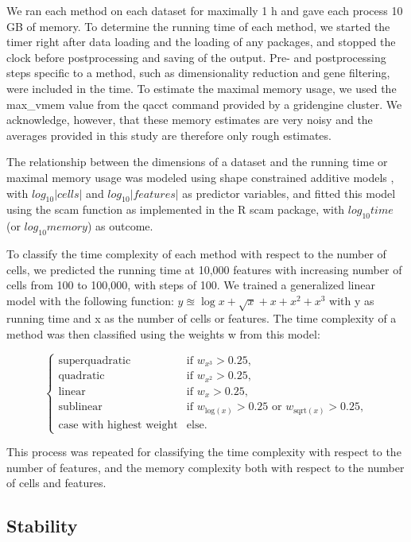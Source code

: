 We ran each method on each dataset for maximally 1 h and gave each process 10 GB of memory. To determine the running time of each method, we started the timer right after data loading and the loading of any packages, and stopped the clock before postprocessing and saving of the output. Pre- and postprocessing steps specific to a method, such as dimensionality reduction and gene filtering, were included in the time. To estimate the maximal memory usage, we used the max\_vmem value from the qacct command provided by a gridengine cluster. We acknowledge, however, that these memory estimates are very noisy and the averages provided in this study are therefore only rough estimates.

The relationship between the dimensions of a dataset and the running time or maximal memory usage was modeled using shape constrained additive models \cite{pya_shapeconstrainedadditive_2015}, with $log_{10}|\textit{cells}|$ and $log_{10}|\textit{features}|$ as predictor variables, and fitted this model using the scam function as implemented in the R scam package, with $log_{10}\textit{time}$ (or $log_{10}\textit{memory}$) as outcome.

To classify the time complexity of each method with respect to the number of cells, we predicted the running time at 10,000 features with increasing number of cells from 100 to 100,000, with steps of 100. We trained a generalized linear model with the following function: $y \approxeq \log{x} + \sqrt{x} + x + x^2 + x^3$ with y as running time and x as the number of cells or features. The time complexity of a method was then classified using the weights w from this model:

$$
\begin{cases}
\text{superquadratic} & \text{if } w_{x^3} > 0.25,\\
\text{quadratic} & \text{if } w_{x^2} > 0.25,\\
\text{linear} & \text{if } w_x > 0.25,\\
\text{sublinear} & \text{if } w_{\text{log}(x)} > 0.25 \text{ or } w_{\text{sqrt}(x)} > 0.25,\\
\text{case with highest weight} & \text{else.}
\end{cases}
$$

This process was repeated for classifying the time complexity with respect to the number of features, and the memory complexity both with respect to the number of cells and features.

\subsection{Stability}

